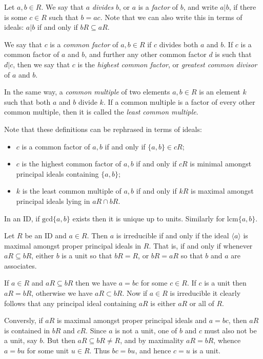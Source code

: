 \documentclass{maths}
\begin{document}
\begin{defn}
    Let $a,b\in R$.
    We say that $a$ \emph{divides} $b$, or $a$ is a \emph{factor} of $b$, and write $a|b$, if there is some $c\in R$ such that $b=ac$.
    Note that we can also write this in terms of ideals: $a|b$ if and only if $bR\subseteq aR$.

    We say that $c$ is a \emph{common factor} of $a,b\in R$ if $c$ divides both $a$ and $b$.
    If $c$ is a common factor of $a$ and $b$, and further any other common factor $d$ is such that $d|c$, then we say that $c$ is the \emph{highest common factor}, or \emph{greatest common divisor} of $a$ and $b$.

    In the same way, a \emph{common multiple} of two elements $a,b\in R$ is an element $k$ such that both $a$ and $b$ divide $k$.
    If a common multiple is a factor of every other common multiple, then it is called the \emph{least common multiple}.

    Note that these definitions can be rephrased in terms of ideals:
    \begin{itemize}
        \item $c$ is a common factor of $a,b$ if and only if $\{a,b\}\in cR$;
        \item $c$ is the highest common factor of $a,b$ if and only if $cR$ is minimal amongst principal ideals containing $\{a,b\}$;
        \item $k$ is the least common multiple of $a,b$ if and only if $kR$ is maximal amongst principal ideals lying in $aR\cap bR$.
    \end{itemize}
\end{defn}

\begin{lem}
    In an ID, if $\mathrm{gcd}\{a,b\}$ exists then it is unique up to units.
    Similarly for $\mathrm{lcm}\{a,b\}$.
\end{lem}

\begin{lem}
    Let $R$ be an ID and $a\in R$.
    Then $a$ is irreducible if and only if the ideal $\langle a\rangle$ is maximal amongst proper principal ideals in $R$.
    That is, if and only if whenever $aR\subseteq bR$, either $b$ is a unit so that $bR=R$, or $bR=aR$ so that $b$ and $a$ are associates.
\end{lem}

\begin{prf}
    If $a\in R$ and $aR\subseteq bR$ then we have $a=bc$ for some $c\in R$.
    If $c$ is a unit then $aR=bR$, otherwise we have $aR\subset bR$.
    Now if $a\in R$ is irreducible it clearly follows that any principal ideal containing $aR$ is either $aR$ or all of $R$.

    Conversly, if $aR$ is maximal amongst proper principal ideals and $a=bc$, then $aR$ is contained in $bR$ and $cR$. Since $a$ is not a unit, one of $b$ and $c$ must also not be a unit, say $b$.
    But then $aR\subseteq bR\neq R$, and by maximality $aR=bR$, whence $a=bu$ for some unit $u\in R$.
    Thus $bc=bu$, and hence $c=u$ is a unit.
\end{prf}
\end{document}
